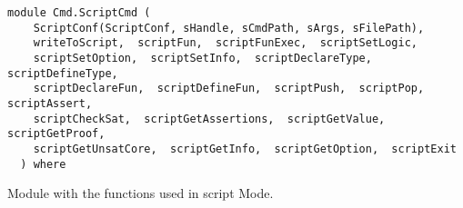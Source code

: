 \label{module:Cmd.ScriptCmd}
\haddockbeginheader
{\haddockverb\begin{verbatim}
module Cmd.ScriptCmd (
    ScriptConf(ScriptConf, sHandle, sCmdPath, sArgs, sFilePath), 
    writeToScript,  scriptFun,  scriptFunExec,  scriptSetLogic, 
    scriptSetOption,  scriptSetInfo,  scriptDeclareType,  scriptDefineType, 
    scriptDeclareFun,  scriptDefineFun,  scriptPush,  scriptPop,  scriptAssert, 
    scriptCheckSat,  scriptGetAssertions,  scriptGetValue,  scriptGetProof, 
    scriptGetUnsatCore,  scriptGetInfo,  scriptGetOption,  scriptExit
  ) where\end{verbatim}}
\haddockendheader

Module with the functions used in script Mode.
\par

